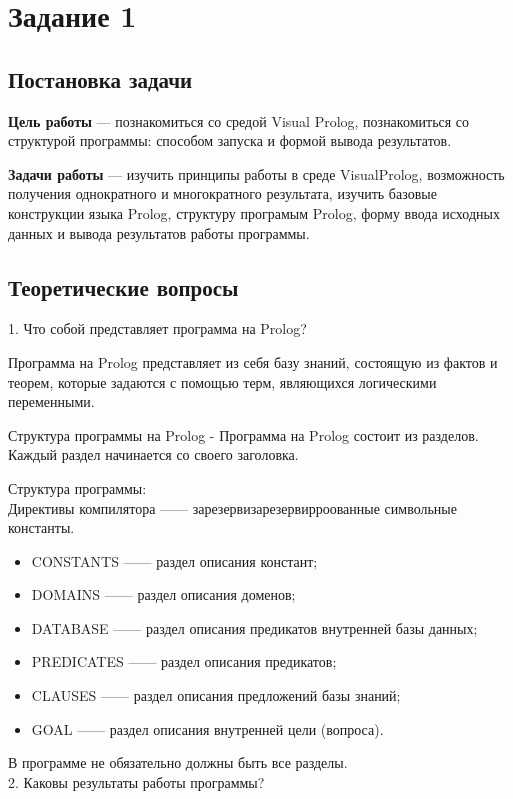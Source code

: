 \section*{Задание 1}
\subsection*{Постановка задачи}

\textbf{Цель работы} --- познакомиться со средой Visual Prolog, познакомиться со структурой программы: способом запуска и формой вывода результатов.  

\textbf{Задачи работы} --- изучить принципы работы в среде VisualProlog, возможность получения однократного и многократного результата, изучить базовые конструкции языка Prolog, структуру програмым Prolog, форму ввода исходных данных и вывода результатов работы программы.

\subsection*{Теоретические вопросы}
1. Что собой представляет программа на Prolog? 

Программа на Prolog представляет из себя базу знаний, состоящую из фактов и теорем, которые задаются с помощью терм, являющихся логическими переменными.

Структура программы на Prolog - Программа на Prolog состоит из разделов. Каждый раздел начинается со своего заголовка. 

Структура программы:\\
Директивы компилятора —— зарезервизарезервирроованные символьные константы.

\begin{itemize}
\item CONSTANTS —— раздел описания констант;
\item DOMAINS —— раздел описания доменов;
\item DATABASE —— раздел описания предикатов внутренней базы данных;
\item PREDICATES —— раздел описания предикатов;
\item CLAUSES —— раздел описания предложений базы знаний;
\item GOAL —— раздел описания внутренней цели (вопроса).
\end{itemize}

В программе не обязательно должны быть все разделы.\\

2. Каковы результаты работы программы? 

